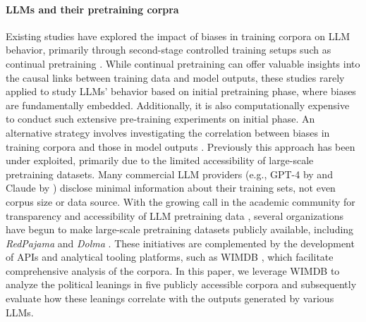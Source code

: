 \paragraph{LLMs and their pretraining corpra}
Existing studies have explored the impact of biases in training corpora on LLM behavior, primarily through second-stage controlled training setups such as continual pretraining \cite{feng-etal-2023-pretraining, chalkidis-brandl-2024-llama}. While continual pretraining can offer valuable insights into the causal links between training data and model outputs, these studies rarely applied to study LLMs' behavior based on initial pretraining phase, where biases are fundamentally embedded. Additionally, it is also computationally expensive to conduct such extensive pre-training experiments on initial phase. %
An alternative strategy involves investigating the correlation between biases in training corpora and those in model outputs \cite{seshadri-etal-2024-bias}. Previously this approach has been under exploited, primarily due to the limited accessibility of large-scale pretraining datasets.
Many commercial LLM providers (e.g., GPT-4 by \citealt{openai2023gpt4} and Claude by \citealt{anthropic2023claude}) disclose minimal information about their training sets, not even corpus size or data source. With the growing call in the academic community for transparency and accessibility of LLM pretraining data \cite{10.1145/3593013.3594002,10.1145/3594737}, several organizations have begun to make large-scale pretraining datasets publicly available, including \textit{RedPajama} \citep{weber2024redpajama} and \textit{Dolma} \cite{soldaini-etal-2024-dolma}. These initiatives are complemented by the development of APIs and analytical tooling platforms, such as WIMDB \cite{elazar2024whats}, which facilitate comprehensive analysis of the corpora. 
In this paper, we leverage WIMDB to analyze the political leanings in five publicly accessible corpora and subsequently evaluate how these leanings correlate with the outputs generated by various LLMs. 

